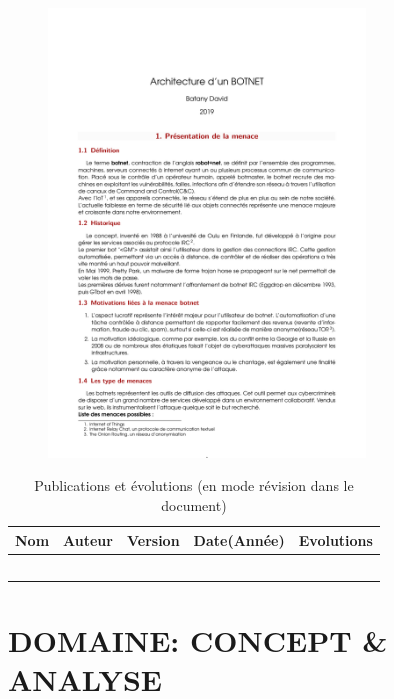 

\begin{figure}[h]
	\centering
		\includegraphics[width=0.75\textwidth]{botnet}
	\label{fig:botnet}
\end{figure}



\begin{table}
\setlength{\tabcolsep}{28pt}
\caption*{Publications et évolutions (en mode révision dans le document)}
\begin{tabular}{ | l | l | l | l | l | }
\hline 
Nom & Auteur & Version & Date(Année) & Evolutions\\ \hline
&&&& \\ \hline
&&&& \\ \hline
&&&& \\ \hline
&&&& \\ \hline
&&&& \\ \hline
\end{tabular}
\end{table}
\section*{DOMAINE: CONCEPT \& ANALYSE}